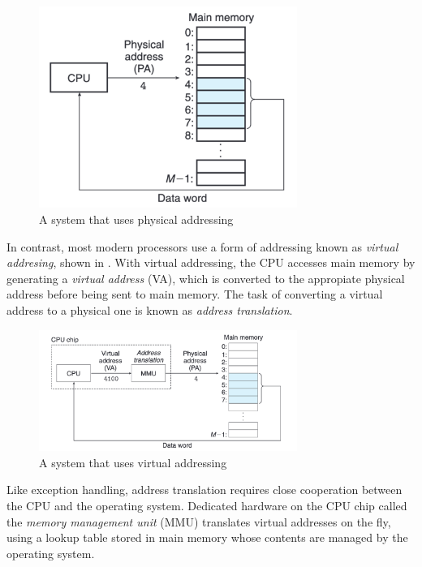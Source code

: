 \documentclass[12pt]{article}
\begin{document}
\begin{figure}[H]
    \centering
    \includegraphics[width=0.75\textwidth]{graphics/Figure 4.1.png}
    \caption{A system that uses physical addressing}
    \label{fig:41}
\end{figure}

In contrast, most modern processors use a form of addressing known as \textit{virtual addresing}, shown in . With virtual addressing, the CPU accesses main memory by generating a \textit{virtual address} (VA), which is converted to the appropiate physical address before being sent to main memory. The task of converting a virtual address to a physical one is known as \textit{address translation}.

\begin{figure}[H]
    \centering
    \includegraphics[width=0.75\textwidth]{graphics/Figure 4.2.png}
    \caption{A system that uses virtual addressing}
    \label{fig:42}
\end{figure}

Like exception handling, address translation requires close cooperation between the CPU and the operating system. Dedicated hardware on the CPU chip called the \textit{memory management unit} (MMU) translates virtual addresses on the fly, using a lookup table stored in main memory whose contents are managed by the operating system.
\end{document}
